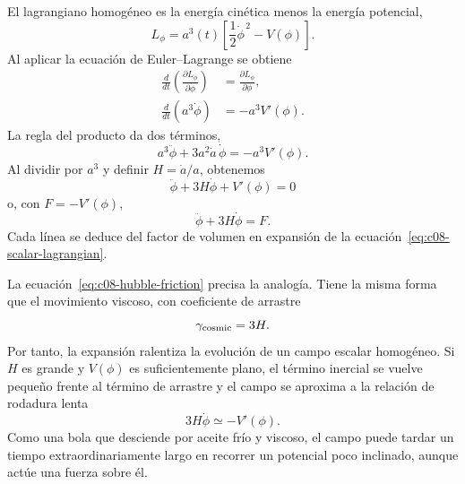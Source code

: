 El lagrangiano homogéneo es la energía cinética menos la energía potencial,
\begin{equation}
L_\phi=a^3(t)
\left[
\frac12\dot\phi^{\,2}-V(\phi)
\right].
\label{eq:c08-scalar-lagrangian}
\end{equation}
Al aplicar la ecuación de Euler--Lagrange se obtiene
\begin{align}
\frac{d}{dt}\left(\frac{\partial L_\phi}{\partial\dot\phi}\right)
&=
\frac{\partial L_\phi}{\partial\phi},\\
\frac{d}{dt}\left(a^3\dot\phi\right)
&=-a^3V'(\phi).
\end{align}
La regla del producto da dos términos,
\begin{equation}
a^3\ddot\phi+3a^2\dot a\,\dot\phi
=-a^3V'(\phi).
\end{equation}
Al dividir por \(a^3\) y definir \(H=\dot a/a\), obtenemos
\begin{equation}
\boxed{
\ddot\phi+3H\dot\phi+V'(\phi)=0
}
\label{eq:c08-hubble-friction}
\end{equation}
o, con \(F=-V'(\phi)\),
\begin{equation}
\ddot\phi+3H\dot\phi=F.
\end{equation}
Cada línea se deduce del factor de volumen en expansión de la ecuación~\eqref{eq:c08-scalar-lagrangian}.

\begin{classroomqa}
\end{classroomqa}

La ecuación~\eqref{eq:c08-hubble-friction} precisa la analogía. Tiene la misma forma que el movimiento viscoso, con coeficiente de arrastre
\begin{equation}
\gamma_{\rm cosmic}=3H.
\end{equation}
Por tanto, la expansión ralentiza la evolución de un campo escalar homogéneo. Si \(H\) es grande y \(V(\phi)\) es suficientemente plano, el término inercial se vuelve pequeño frente al término de arrastre y el campo se aproxima a la relación de rodadura lenta
\begin{equation}
3H\dot\phi\simeq-V'(\phi).
\end{equation}
Como una bola que desciende por aceite frío y viscoso, el campo puede tardar un tiempo extraordinariamente largo en recorrer un potencial poco inclinado, aunque actúe una fuerza sobre él.

